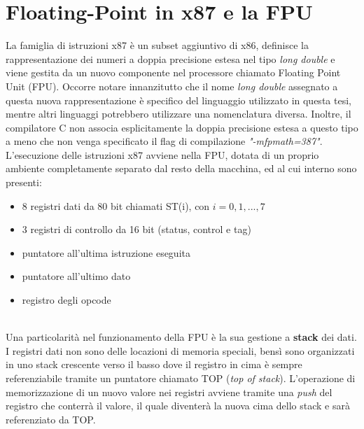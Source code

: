 \documentclass[Lau, oneside]{sapthesis}%
\begin{document}
\section{Floating-Point in x87 e la FPU}
La famiglia di istruzioni x87 è un subset aggiuntivo di x86, definisce la rappresentazione dei numeri a doppia precisione estesa nel tipo \textit{long double} e viene gestita da un nuovo componente nel processore chiamato Floating Point Unit (FPU).
\newline \newline
Occorre notare innanzitutto che il nome \textit{long double} assegnato a questa nuova rappresentazione è specifico del linguaggio utilizzato in questa tesi, mentre altri linguaggi potrebbero utilizzare una nomenclatura diversa.
\newline
Inoltre, il compilatore C non associa esplicitamente la doppia precisione estesa a questo tipo a meno che non venga specificato il flag di compilazione \textit{"-mfpmath=387"}.
\newline \newline
L'esecuzione delle istruzioni x87 avviene nella FPU, dotata di un proprio ambiente completamente separato dal resto della macchina, ed al cui interno sono presenti:
\begin{itemize}
    \item 8 registri dati da 80 bit chiamati ST(i), con $i = 0,1,...,7$
    \item 3 registri di controllo da 16 bit (status, control e tag)
    \item puntatore all'ultima istruzione eseguita
    \item puntatore all'ultimo dato
    \item registro degli opcode
\end{itemize}
\ \\
Una particolarità nel funzionamento della FPU è la sua gestione a \textbf{stack} dei dati.
\newline
I registri dati non sono delle locazioni di memoria speciali, bensì sono organizzati in uno stack crescente verso il basso dove il registro in cima è sempre referenziabile tramite un puntatore chiamato TOP (\textit{top of stack}).
\newline \newline
L'operazione di memorizzazione di un nuovo valore nei registri avviene tramite una \textit{push} del registro che conterrà il valore, il quale diventerà la nuova cima dello stack e sarà referenziato da TOP.
\newline
\end{document}

